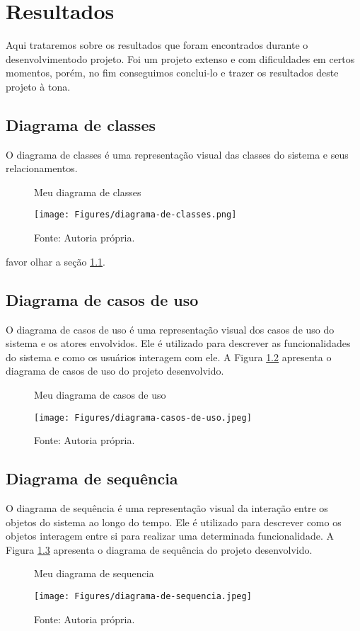 \chapter{Resultados}
\label{chap:result}
Aqui trataremos sobre os resultados que foram encontrados durante o desenvolvimentodo projeto. Foi um projeto extenso e com dificuldades em certos momentos, porém, no fim conseguimos conclui-lo e trazer os resultados deste projeto à tona.


\section{Diagrama de classes}
\label{sec:class}
O diagrama de classes é uma representação visual das classes do sistema e seus relacionamentos. 
\begin{figure} [h!]	
    \centering
    \caption{Meu diagrama de classes}
    \texttt{[image: Figures/diagrama-de-classes.png]}
    \caption*{Fonte: Autoria própria.}
    \label{fig:diagrama_classes}
\end{figure}

favor olhar a seção \ref{sec:class}.


\section{Diagrama de casos de uso}
\label{sec:casos}
O diagrama de casos de uso é uma representação visual dos casos de uso do sistema e os atores envolvidos. Ele é utilizado para descrever as funcionalidades do sistema e como os usuários interagem com ele. A Figura \ref{fig:diagrama_casos} apresenta o diagrama de casos de uso do projeto desenvolvido.
\begin{figure} [h!]	
    \centering
    \caption{Meu diagrama de casos de uso}
    \texttt{[image: Figures/diagrama-casos-de-uso.jpeg]}
    \caption*{Fonte: Autoria própria.}
    \label{fig:diagrama_casos}
\end{figure}


\section{Diagrama de sequência}
\label{sec:sequencia}   
O diagrama de sequência é uma representação visual da interação entre os objetos do sistema ao longo do tempo. Ele é utilizado para descrever como os objetos interagem entre si para realizar uma determinada funcionalidade. A Figura \ref{fig:diagrama_sequencia} apresenta o diagrama de sequência do projeto desenvolvido. 
\begin{figure} [h!]	
    \centering
    \caption{Meu diagrama de sequencia}
    \texttt{[image: Figures/diagrama-de-sequencia.jpeg]}
    \caption*{Fonte: Autoria própria.}
    \label{fig:diagrama_sequencia}
\end{figure}








